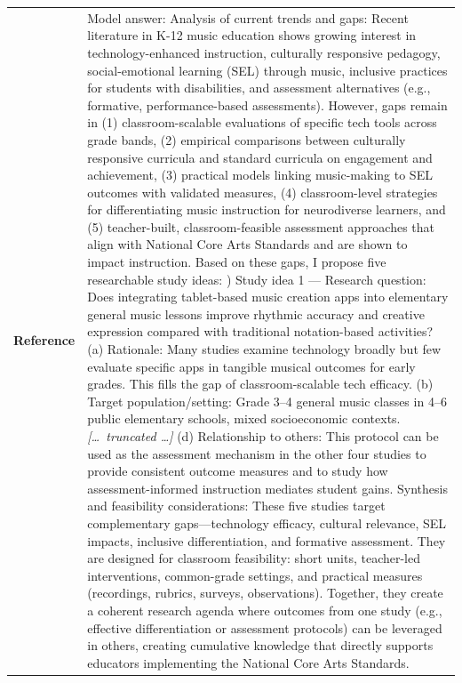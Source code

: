 \begin{longtable}{@{}l p{12.5cm}@{}}
  \textbf{Reference} & Model answer: \newline Analysis of current trends and gaps: Recent literature in K-12 music education shows growing interest in technology-enhanced instruction, culturally responsive pedagogy, social-emotional learning (SEL) through music, inclusive practices for students with disabilities, and assessment alternatives (e.g., formative, performance-based assessments). However, gaps remain in (1) classroom-scalable evaluations of specific tech tools across grade bands, (2) empirical comparisons between culturally responsive curricula and standard curricula on engagement and achievement, (3) practical models linking music-making to SEL outcomes with validated measures, (4) classroom-level strategies for differentiating music instruction for neurodiverse learners, and (5) teacher-built, classroom-feasible assessment approaches that align with National Core Arts Standards and are shown to impact instruction. \newline Based on these gaps, I propose five researchable study ideas: \newline 1) Study idea 1 --- Research question: Does integrating tablet-based music creation apps into elementary general music lessons improve rhythmic accuracy and creative expression compared with traditional notation-based activities? \newline (a) Rationale: Many studies examine technology broadly but few evaluate specific apps in tangible musical outcomes for early grades. This fills the gap of classroom-scalable tech efficacy. \newline (b) Target population/setting: Grade 3--4 general music classes in 4--6 public elementary schools, mixed socioeconomic contexts. \newline \textit{[\ldots\ truncated \ldots]} \newline (d) Relationship to others: This protocol can be used as the assessment mechanism in the other four studies to provide consistent outcome measures and to study how assessment-informed instruction mediates student gains. \newline Synthesis and feasibility considerations: These five studies target complementary gaps---technology efficacy, cultural relevance, SEL impacts, inclusive differentiation, and formative assessment. They are designed for classroom feasibility: short units, teacher-led interventions, common-grade settings, and practical measures (recordings, rubrics, surveys, observations). Together, they create a coherent research agenda where outcomes from one study (e.g., effective differentiation or assessment protocols) can be leveraged in others, creating cumulative knowledge that directly supports educators implementing the National Core Arts Standards. \\

\end{longtable}
